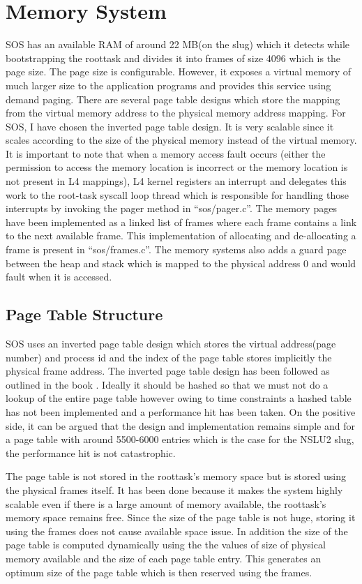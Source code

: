 \documentclass[a4paper, 11pt]{article}
\begin{document}
\section{Memory System}
SOS has an available RAM of around 22 MB(on the slug) which it detects
while bootstrapping the roottask and divides it into frames
of size 4096 which is the page size. The page size is configurable. However,
it exposes a virtual memory of much larger size to the application
programs and provides this service using demand paging. There are
several page table designs which store the mapping from the virtual
memory address to the physical memory address mapping. For SOS, I have
chosen the inverted page table design. It is very scalable since it
scales according to the size of the physical memory instead of the
virtual memory. It is important to note that when a memory access
fault occurs (either the permission to access the memory location is
incorrect or the memory location is not present in L4 mappings), L4
kernel registers an interrupt and delegates this work to the root-task
syscall loop thread which is responsible for handling those interrupts
by invoking the pager method in ``sos/pager.c''. The memory pages have
been implemented as a linked list of frames where each frame contains
a link to the next available frame. This implementation of allocating
and de-allocating a frame is present in ``sos/frames.c''. The memory
systems also adds a guard page between the heap and stack which is
mapped to the physical address 0 and would fault when it is accessed.

\subsection{Page Table Structure}
SOS uses an inverted page table design which stores the virtual
address(page number) and process id and the index of the page table
stores implicitly the physical frame address. The inverted page table
design has been followed as outlined in the book
\cite[Page~395]{tanenbaum}.  Ideally it should be
hashed so that we must not do a lookup of the entire page table
however owing to time constraints a hashed table has not been
implemented and a performance hit has been taken. On the positive
side, it can be argued that the design and implementation remains
simple and for a page table with around 5500-6000 entries which is the
case for the NSLU2 slug, the performance hit is not catastrophic.

The page table is not stored in the roottask's memory space but is
stored using the physical frames itself. It has been done because it
makes the system highly scalable even if there is a large amount of
memory available, the roottask's memory space remains free. Since the
size of the page table is not huge, storing it using the frames does
not cause available space issue. In addition the size of the page
table is computed dynamically using the the values of size of physical
memory available and the size of each page table entry. This generates
an optimum size of the page table which is then reserved using the
frames. 
\end{document}
